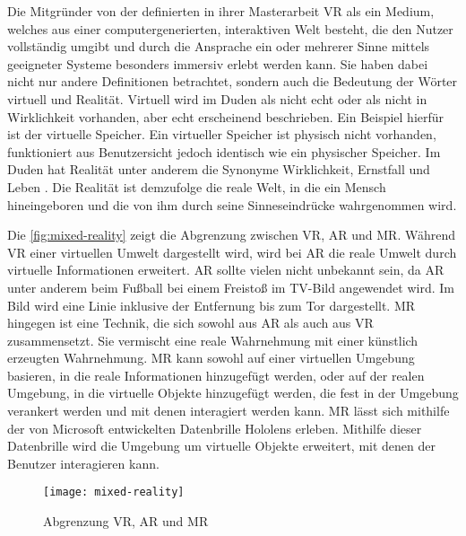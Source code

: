Die Mitgründer von der   definierten in ihrer Masterarbeit \ac{VR} als \glqq ein Medium, welches aus einer computergenerierten, interaktiven Welt besteht, die den Nutzer vollständig umgibt und durch die Ansprache ein oder mehrerer Sinne mittels geeigneter Systeme besonders immersiv erlebt werden kann\grqq \cite{omnia.2017}. Sie haben dabei nicht nur andere Definitionen betrachtet, sondern auch die Bedeutung der Wörter virtuell und Realität. Virtuell wird im Duden als \glqq nicht echt \grqq \cite{DudenVirtuell} oder als \glqq nicht in Wirklichkeit vorhanden, aber echt erscheinend\grqq \cite{DudenVirtuell} beschrieben. Ein Beispiel hierfür ist der virtuelle Speicher. Ein virtueller Speicher ist physisch nicht vorhanden, funktioniert aus Benutzersicht jedoch identisch wie ein physischer Speicher. Im Duden hat Realität unter anderem die Synonyme Wirklichkeit, Ernstfall und Leben \cite{DudenRealitaet}. Die Realität ist demzufolge \glqq die reale Welt, in die ein Mensch hineingeboren und die von ihm durch seine Sinneseindrücke wahrgenommen wird\grqq \cite{omnia.2017}.

Die \autoref{fig:mixed-reality} zeigt die Abgrenzung zwischen \ac{VR}, \ac{AR} und \ac{MR}. Während \ac{VR} einer virtuellen Umwelt dargestellt wird, wird bei \ac{AR} die reale Umwelt durch virtuelle Informationen erweitert. \ac{AR} sollte vielen nicht unbekannt sein, da \ac{AR} unter anderem beim Fußball bei einem Freistoß im TV-Bild angewendet wird. Im Bild wird eine Linie inklusive der Entfernung bis zum Tor dargestellt. \ac{MR} hingegen ist eine Technik, die sich sowohl aus \ac{AR} als auch aus \ac{VR} zusammensetzt. Sie vermischt eine reale Wahrnehmung mit einer künstlich erzeugten Wahrnehmung. \ac{MR} kann sowohl auf einer virtuellen Umgebung basieren, in die reale Informationen hinzugefügt werden, oder auf der realen Umgebung, in die virtuelle Objekte hinzugefügt werden, die fest in der Umgebung verankert werden und mit denen interagiert werden kann. \ac{MR} lässt sich mithilfe der von Microsoft entwickelten Datenbrille Hololens erleben. Mithilfe dieser Datenbrille wird die Umgebung um virtuelle Objekte erweitert, mit denen der Benutzer interagieren kann.
\begin{figure}[!htbp]
	\centering
	\texttt{[image: mixed-reality]}
	\caption[Abgrenzung VR, AR und MR]{Abgrenzung VR, AR und MR \cite[S. 20]{BurofurTechnikfolgenAbschatzungbeimDeutschenBundestag.2019}}
	\label{fig:mixed-reality}
\end{figure}

